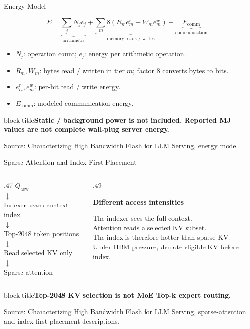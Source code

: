 \documentclass[aspectratio=169,10pt]{beamer}
\newcommand{\takeaway}[1]{\par\vspace{.12cm}\begin{beamercolorbox}[rounded=true,sep=.12cm,wd=\linewidth]{block title}\small\bfseries #1\end{beamercolorbox}}
\newcommand{\src}[1]{\par\vfill{\fontsize{7}{8}\selectfont\color{Muted}Source: Characterizing High Bandwidth Flash for LLM Serving, #1.}\par}
\newcommand{\head}[1]{\par{\color{Accent}\bfseries #1}\par\smallskip}
\begin{document}
\begin{frame}[t]{Energy Model}

\vspace{.25cm}
\[E=\underbrace{\sum_j N_j e_j}_{\text{arithmetic}}+\underbrace{\sum_m 8(R_m e_m^r+W_m e_m^w)}_{\text{memory reads / writes}}+\underbrace{E_{\mathrm{comm}}}_{\text{communication}}\]
\vspace{.4cm}
\begin{itemize}
\item $N_j$: operation count; $e_j$: energy per arithmetic operation.
\item $R_m,W_m$: bytes read / written in tier $m$; factor 8 converts bytes to bits.
\item $e_m^r,e_m^w$: per-bit read / write energy.
\item $E_{\mathrm{comm}}$: modeled communication energy.
\end{itemize}
\vspace{.2cm}
\takeaway{Static / background power is not included. Reported MJ values are not complete wall-plug server energy.}

\src{energy model}
\end{frame}

\begin{frame}[t]{Sparse Attention and Index-First Placement}

\begin{columns}[T,onlytextwidth]
\begin{column}{.47\textwidth}\centering
$Q_{\mathrm{new}}$\\[.1cm]$\downarrow$\\[.1cm]
Indexer scans context index\\[.1cm]$\downarrow$\\[.1cm]
Top-2048 token positions\\[.1cm]$\downarrow$\\[.1cm]
Read selected KV only\\[.1cm]$\downarrow$\\[.1cm]
Sparse attention
\end{column}
\begin{column}{.49\textwidth}
\head{Different access intensities}
The indexer sees the full context.\\[.2cm]
Attention reads a selected KV subset.\\[.2cm]
The index is therefore hotter than sparse KV.\\[.2cm]
Under HBM pressure, demote eligible KV before index.
\end{column}
\end{columns}
\takeaway{Top-2048 KV selection is not MoE Top-k expert routing.}

\src{sparse-attention and index-first placement descriptions}
\end{frame}
\end{document}
